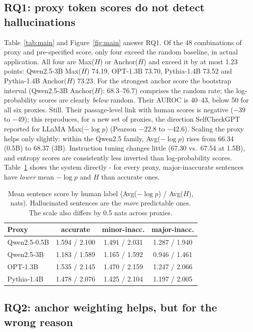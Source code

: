 \documentclass[acmsmall,screen,review,nonacm]{acmart}
\begin{document}
\subsection{RQ1: proxy token scores do not detect hallucinations}
\label{sec:rq1}
Table~\ref{tab:main} and Figure~\ref{fig:main} answer RQ1. Of the 48 combinations of proxy and pre-specified score, only four exceed the random baseline, in actual application. All four are Max($H$) or Anchor($H$) and exceed it by at most 1.23 points: Qwen2.5-3B Max($H$) 74.19, OPT-1.3B 73.70, Pythia-1.4B 73.52 and Pythia-1.4B Anchor($H$) 73.23. For the strongest anchor score the bootstrap interval (Qwen2.5-3B Anchor($H$): 68.3--76.7) comprises the random rate; the log-probability scores are clearly \emph{below} random. Their AUROC is 40--43, below 50 for all six proxies. Still. Their passage-level link with human scores is negative ($-$39 to $-$49); this reproduces, for a new set of proxies, the direction SelfCheckGPT reported for LLaMA Max($-\log p$) (Pearson $-$22.8 to $-$42.6). Scaling the proxy helps only slightly: within the Qwen2.5 family, Avg($-\log p$) rises from 66.34 (0.5B) to 68.37 (3B). Instruction tuning changes little (67.30 vs.\ 67.54 at 1.5B), and entropy scores are consistently less inverted than log-probability scores. Table~\ref{tab:dist} shows the system directly - for every proxy, major-inaccurate sentences have \emph{lower} mean $-\log p$ and $H$ than accurate ones.

\begin{table}[t]
  \caption{Mean sentence score by human label (Avg($-\log p$) / Avg($H$), nats). Hallucinated sentences are the \emph{more} predictable ones. The scale also differs by 0.5 nats across proxies.}
  \label{tab:dist}
  \footnotesize
  \begin{tabular}{lccc}
    \toprule
    Proxy & accurate & minor-inacc. & major-inacc. \\
    \midrule
    Qwen2.5-0.5B & 1.594 / 2.100 & 1.491 / 2.031 & 1.287 / 1.940 \\
    Qwen2.5-3B & 1.183 / 1.589 & 1.165 / 1.592 & 0.946 / 1.461 \\
    OPT-1.3B & 1.535 / 2.145 & 1.470 / 2.159 & 1.247 / 2.066 \\
    Pythia-1.4B & 1.478 / 2.076 & 1.425 / 2.104 & 1.197 / 2.005 \\
    \bottomrule
  \end{tabular}
\end{table}

\subsection{RQ2: anchor weighting helps, but for the wrong reason}
\label{sec:rq2}
\end{document}
